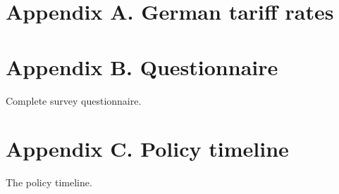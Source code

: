 \documentclass[a4paper, 12pt]{article}
\begin{document}
%



\section{Appendix A. German tariff rates}

\section{Appendix B. Questionnaire}
Complete survey questionnaire.

\section{Appendix C. Policy timeline}
The policy timeline.





\end{document}
